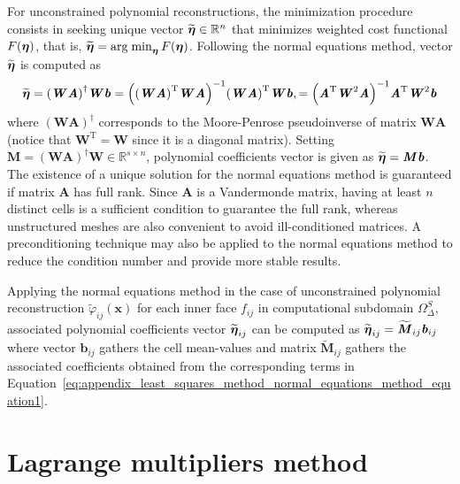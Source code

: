 For unconstrained polynomial reconstructions, the minimization procedure consists in seeking unique vector $\widetilde{\boldsymbol{\eta}}\in\mathbb{R}^{n}$ that minimizes weighted cost functional $F\left(\bs{\eta}\right)$, that is, $\widetilde{\bs{\eta}}=\argmin_{\bs{\eta}}F\left(\bs{\eta}\right)$.
Following the normal equations method, vector $\widetilde{\boldsymbol{\eta}}$ is computed as
\begin{equation}
\label{eq:appendix_least_squares_method_normal_equations_method_equation1}
\widetilde{\bs{\eta}}
=\left(\bm{W}\bm{A}\right)^{\dagger}\bm{W}\bm{b}
=\left(\left(\bm{W}\bm{A}\right)^{\textrm{T}}\bm{W}\bm{A}\right)^{-1}\left(\bm{W}\bm{A}\right)^{\textrm{T}}\bm{W}\bm{b},
=\left(\bm{A}^{\textrm{T}}\bm{W}^{2}\bm{A}\right)^{-1}\bm{A}^{\textrm{T}}\bm{W}^{2}\bm{b}
\end{equation}
where $\left(\bm{W}\bm{A}\right)^{\dagger}$ corresponds to the Moore-Penrose pseudoinverse of matrix $\bm{W}\bm{A}$ (notice that $\bm{W}^{\textrm{T}}=\bm{W}$ since it is a diagonal matrix).
Setting $\bm{M}=\left(\bm{W}\bm{A}\right)^{\dagger}\bm{W}\in\mathbb{R}^{s\times n}$, polynomial coefficients vector is given as $\widetilde{\boldsymbol{\eta}}=\textrm{\textbf{\textit{M}}}\textrm{\textbf{\textit{b}}}$.
The existence of a unique solution for the normal equations method is guaranteed if matrix $\bm{A}$ has full rank.
Since $\bm{A}$ is a Vandermonde matrix, having at least $n$ distinct cells is a sufficient condition to guarantee the full rank, whereas unstructured meshes are also convenient to avoid ill-conditioned matrices.
A preconditioning technique may also be applied to the normal equations method to reduce the condition number and provide more stable results.

Applying the normal equations method in the case of unconstrained polynomial reconstruction $\widetilde{\varphi}_{ij}\left(\bm{x}\right)$ for each inner face $f_{ij}$ in computational subdomain $\Omega^{S}_{\Delta}$, associated polynomial coefficients vector $\widetilde{\boldsymbol{\eta}}_{ij}$ can be computed as $\widetilde{\boldsymbol{\eta}}_{ij}=\widetilde{\textrm{\textbf{\textit{M}}}}_{ij}\textrm{\textbf{\textit{b}}}_{ij}$ where vector $\bm{b}_{ij}$ gathers the cell mean-values and matrix $\widetilde{\bm{M}}_{ij}$ gathers the associated coefficients obtained from the corresponding terms in Equation~\cref{eq:appendix_least_squares_method_normal_equations_method_equation1}.

\section{Lagrange multipliers method}
\label{sec:appendix_least_squares_method_lagrande_multipliers_method}

